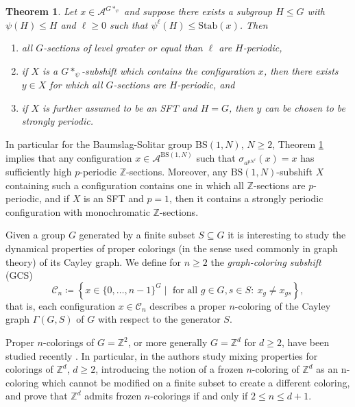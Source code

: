 \documentclass[letterpaper,11pt,reqno]{amsart}
\theoremstyle{plain}
\newtheorem{theorem}{Theorem}[section]
\theoremstyle{definition}
\newcommand{\BS}[1][N]{\mathrm{BS}(1,#1)}
\begin{document}
\begin{theorem}\label{thm:summary_weak_periodicity}
	Let $x\in \mathcal{A}^{G*_{\psi}}$ and suppose there exists a subgroup $H\leqslant G$ with $\psi(H)\leqslant H$ and $\ell\ge 0$ such that $\psi^{\ell}(H)\leqslant \mathrm{Stab}(x)$. Then
	\begin{enumerate}
		\item all $G$-sections of level greater or equal than $\ell$ are $H$-periodic,
		\item if $X$ is a $G*_{\psi}$-subshift which contains the configuration $x$, then there exists $y\in X$ for which all $G$-sections are $H$-periodic, and 
		\item if $X$ is further assumed to be an SFT and $H=G$, then $y$ can be chosen to be strongly periodic.
	\end{enumerate}
\end{theorem}

In particular for the Baumslag-Solitar group $\BS$, $N\ge 2$, Theorem \ref{thm:summary_weak_periodicity} implies that any configuration $x\in \mathcal{A}^{\BS}$ such that $\sigma_{a^{pN^\ell}}(x)=x$ has sufficiently high $p$-periodic $\mathbb{Z}$-sections. Moreover, any $\BS$-subshift $X$ containing such a configuration contains one in which all $\mathbb{Z}$-sections are $p$-periodic, and if $X$ is an SFT and $p=1$, then it contains a strongly periodic configuration with monochromatic $\mathbb{Z}$-sections.


Given a group $G$ generated by a finite subset $S\subseteq G$ it is interesting to study the dynamical properties of proper colorings (in the sense used commonly in graph theory) of its Cayley graph. We define for $n\ge 2$ the \textit{graph-coloring subshift} (GCS)
$$
\mathcal{C}_{n}\coloneqq\left\{x\in \{0,\ldots,n-1\}^G\mid \text{ for all } g\in G, s\in S: \ x_{g}\neq x_{gs} \right\},
$$
that is, each configuration $x\in \mathcal{C}_{n}$ describes a proper $n$-coloring of the Cayley graph $\Gamma(G,S)$ of $G$ with respect to the generator $S$. 

Proper $n$-colorings of $G=\mathbb{Z}^2$, or more generally $G=\mathbb{Z}^d$ for $d\ge 2$, have been studied recently \cite{alon2019mixing, peled2018rigidity, ray2020proper}. In particular, in \cite{alon2019mixing} the authors study mixing properties for colorings of $\mathbb{Z}^d$, $d\ge 2$, introducing the notion of a frozen $n$-coloring of $\mathbb{Z}^d$ as an n-coloring which cannot be modified on a finite subset to create a different coloring, and prove that $\mathbb{Z}^d$ admits frozen $n$-colorings if and only if $2\le n\le d+1$. 
\end{document}
